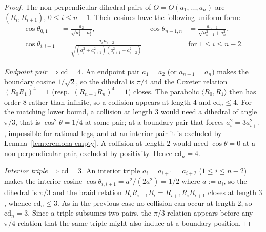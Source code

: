 \documentclass[11pt,a4paper]{article}
\theoremstyle{remark}
\theoremstyle{plain}
\begin{document}
\begin{proof}
The non-perpendicular dihedral pairs of $O = O(a_1, \ldots, a_n)$
are $(R_i, R_{i+1})$, $0 \le i \le n-1$.  Their cosines have the
following uniform form:
\begin{align*}
\cos \theta_{0, 1} &= \frac{a_2}{\sqrt{a_1^2 + a_2^2}}, &
\cos \theta_{n-1, n} &= \frac{a_{n-1}}{\sqrt{a_{n-1}^2 + a_n^2}},
\\
\cos \theta_{i, i+1} &= \frac{a_i\, a_{i+2}}
   {\sqrt{(a_i^2 + a_{i+1}^2)(a_{i+1}^2 + a_{i+2}^2)}}
& &\text{for } 1 \le i \le n-2.
\end{align*}

\emph{Endpoint pair $\Rightarrow \mathrm{cd} = 4$.}  An endpoint
pair $a_1 = a_2$ (or $a_{n-1} = a_n$) makes the boundary cosine
$1/\sqrt 2$, so the dihedral is $\pi/4$ and the Coxeter relation
$(R_0 R_1)^4 = 1$ (resp.\ $(R_{n-1} R_n)^4 = 1$) closes.  The
parabolic $\langle R_0, R_1 \rangle$ then has order $8$ rather than infinite, so
a collision appears at length $4$ and $\mathrm{cd}_n \le 4$. For the matching
lower bound, a collision at length $3$ would need a dihedral of angle $\pi/3$,
that is $\cos^2\theta = 1/4$ at some pair; at a boundary pair that forces
$a_i^2 = 3 a_{i+1}^2$, impossible for rational legs, and at an interior pair it
is excluded by Lemma~\ref{lem:cremona-empty}. A collision at length $2$ would
need $\cos\theta = 0$ at a non-perpendicular pair, excluded by positivity. Hence
$\mathrm{cd}_n = 4$.

\emph{Interior triple $\Rightarrow \mathrm{cd} = 3$.}  An interior
triple $a_i = a_{i+1} = a_{i+2}$ ($1 \le i \le n-2$) makes the
interior cosine $\cos \theta_{i, i+1} = a^2 / (2 a^2) = 1/2$ where
$a := a_i$, so the dihedral is $\pi/3$ and the braid relation
$R_i R_{i+1} R_i = R_{i+1} R_i R_{i+1}$ closes at length $3$, whence
$\mathrm{cd}_n \le 3$. As in the previous case no collision can occur at length
$2$, so $\mathrm{cd}_n = 3$. Since a triple subsumes two pairs, the $\pi/3$
relation appears before any $\pi/4$ relation that the same triple might also
induce at a boundary position.


\end{proof}
\end{document}
